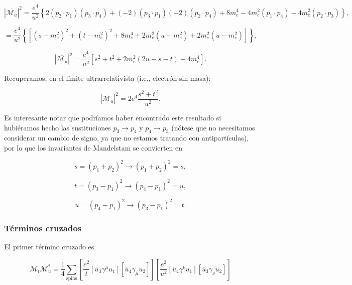\begin{equation}
|\overline{\mathcal{M}_u}|^2 = \frac{e^4}{u^2} \left\{ 2(p_2 \cdot p_1)(p_3 \cdot p_4) + (-2)(p_3 \cdot p_1)(-2)(p_2 \cdot p_4) + 8m_e^4 - 4m_e^2(p_1 \cdot p_4) - 4m_e^2(p_2 \cdot p_3) \right\},
\end{equation}

\begin{equation}
= \frac{e^4}{u^2} \left\{ [(s - m_e^2)^2 + (t - m_e^2)^2 + 8m_e^4 + 2m_e^2(u - m_e^2) + 2m_e^2(u - m_e^2)] \right\},
\end{equation}

\begin{equation}
|\overline{\mathcal{M}_u}|^2 = \frac{e^4}{u^2} \left[ s^2 + t^2 + 2m_e^2(2u - s - t) + 4m_e^4 \right].
\end{equation}

Recuperamos, en el límite ultrarrelativista (i.e., electrón sin masa):

\begin{equation}
|\overline{\mathcal{M}_u}|^2 = 2e^4 \frac{s^2 + t^2}{u^2}.
\end{equation}

Es interesante notar que podríamos haber encontrado este resultado si hubiéramos hecho las sustituciones $ p_3 \to p_4 $ y $ p_4 \to p_3 $ (nótese que no necesitamos considerar un cambio de signo, ya que no estamos tratando con antipartículas), por lo que los invariantes de Mandelstam se convierten en

\begin{equation}
s = (p_1 + p_2)^2 \rightarrow (p_1 + p_2)^2 = s,
\end{equation}

\begin{equation}
t = (p_3 - p_1)^2 \rightarrow (p_4 - p_1)^2 = u,
\end{equation}

\begin{equation}
u = (p_4 - p_1)^2 \rightarrow (p_3 - p_1)^2 = t.
\end{equation}

\subsubsection{Términos cruzados}
El primer término cruzado es

\begin{equation}
\mathcal{M}_t \mathcal{M}_u^* = \frac{1}{4} \sum_{\text{spins}} \left[ \frac{e^2}{t} [\bar{u}_3 \gamma^\mu u_1] [\bar{u}_4 \gamma_\mu u_2] \right] \left[ \frac{e^2}{u^2} [\bar{u}_4 \gamma^\nu u_1] [\bar{u}_3 \gamma_\nu u_2] \right]
\end{equation}


